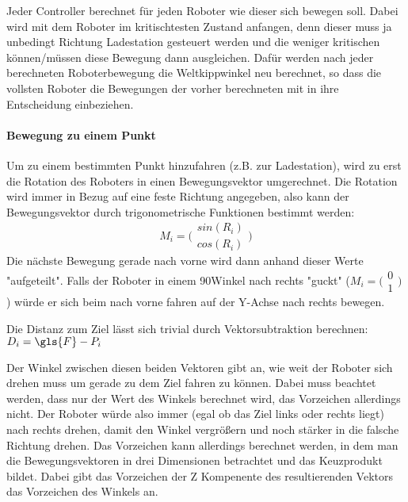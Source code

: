 {Jeder Controller berechnet f{\"{u}}r jeden Roboter wie dieser sich bewegen soll. Dabei wird mit dem Roboter
im kritischtesten Zustand anfangen, denn dieser muss ja unbedingt Richtung Ladestation gesteuert werden 
und die weniger kritischen k{\"{o}}nnen/m{\"{u}}ssen diese Bewegung dann ausgleichen. Daf{\"{u}}r werden nach
jeder berechneten Roboterbewegung die Weltkippwinkel neu berechnet, so dass die vollsten Roboter die Bewegungen
der vorher berechneten mit in ihre Entscheidung einbeziehen.

\paragraph{Bewegung zu einem Punkt} Um zu einem bestimmten Punkt hinzufahren (z.B. zur Ladestation),
wird zu erst die Rotation des Roboters in einen Bewegungsvektor umgerechnet. Die Rotation wird immer in Bezug
auf eine feste Richtung angegeben, also kann der Bewegungsvektor durch trigonometrische Funktionen bestimmt werden:
\begin{equation}
\label{eq:M}
	M_i = \bigl(\begin{smallmatrix} sin(R_i) \\ cos(R_i) \end{smallmatrix}\bigr)
\end{equation}
Die n{\"{a}}chste Bewegung gerade nach vorne wird dann anhand dieser Werte "aufgeteilt". Falls der Roboter
in einem 90\textdegree Winkel nach rechts "guckt" ($M_i = \bigl(\begin{smallmatrix} 0 \\ 1 \end{smallmatrix}\bigr)$)
w{\"{u}}rde er sich beim nach vorne fahren auf der Y-Achse nach rechts bewegen.

Die Distanz zum Ziel l{\"{a}}sst sich trivial durch Vektorsubtraktion berechnen: $ D_i = \gls{F} - P_i $

Der Winkel zwischen diesen beiden Vektoren gibt an, wie weit der Roboter sich drehen muss um gerade zu dem Ziel 
fahren zu k{\"{o}}nnen. Dabei muss beachtet werden, dass nur der Wert des Winkels berechnet wird, das
Vorzeichen allerdings nicht. Der Roboter w{\"{u}}rde also immer (egal ob das Ziel links oder rechts liegt) nach 
rechts drehen, damit den Winkel vergr{\"{o}}{\ss}ern und noch st{\"{a}}rker in die falsche Richtung drehen.
Das Vorzeichen kann allerdings berechnet werden, in dem man die Bewegungsvektoren in drei Dimensionen betrachtet 
und das Keuzprodukt bildet. Dabei gibt das Vorzeichen der Z Kompenente des resultierenden Vektors das Vorzeichen 
des Winkels an.

}
